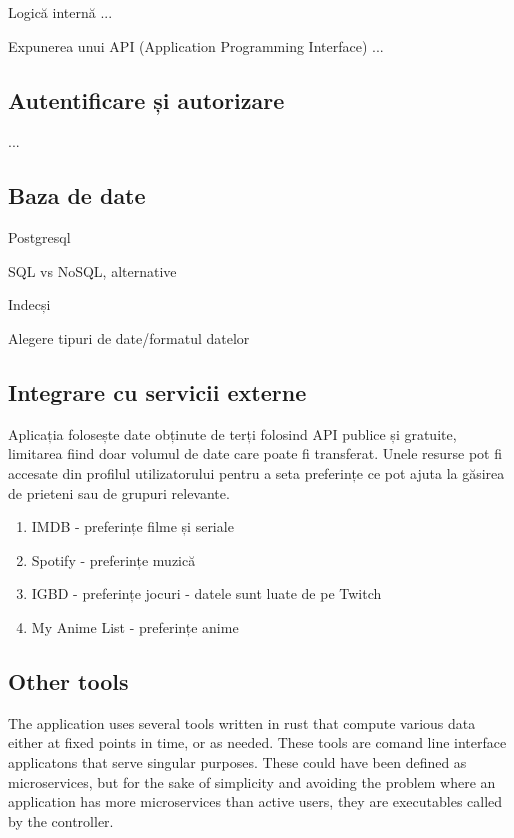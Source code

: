     Logică internă ...

    Expunerea unui API (Application Programming Interface) ...
    \subsection{Autentificare și autorizare}
    \label{Autentificare}
    ...
    \subsection{Baza de date}
    \label{Baza de date}
    Postgresql

    SQL vs NoSQL, alternative

    Indecși

    Alegere tipuri de date/formatul datelor
    \subsection{Integrare cu servicii externe}
    \label{Integrare cu servicii externe}
    Aplicația folosește date obținute de terți folosind API publice și gratuite, limitarea fiind doar volumul de date care poate fi transferat. Unele resurse pot fi accesate din profilul utilizatorului pentru a seta preferințe ce pot ajuta la găsirea de prieteni sau de grupuri relevante.

    \begin{enumerate}[noitemsep, leftmargin=0.3cm]
        \item IMDB - preferințe filme și seriale
        \item Spotify - preferințe muzică
        \item IGBD - preferințe jocuri - datele sunt luate de pe Twitch
        \item My Anime List - preferințe anime
    \end{enumerate}
    
    \subsection{Other tools}
    \label{Other tools}
    The application uses several tools written in rust that compute various data either at fixed points in time, or as needed. These tools are comand line interface applicatons that serve singular purposes. These could have been defined as microservices, but for the sake of simplicity and avoiding the problem where an application has more microservices than active users, they are executables called by the controller.

